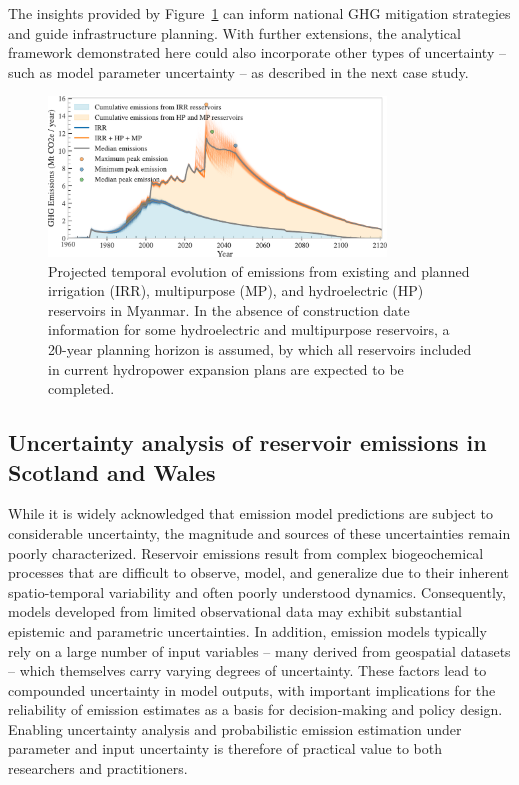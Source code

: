 \documentclass[final,1p,times]{elsarticle}
\begin{document}
The insights provided by Figure~\ref{fig:mya_emission_profile} can inform national \ac{GHG} mitigation strategies and guide infrastructure planning.
With further extensions, the analytical framework demonstrated here could also incorporate other types of uncertainty -- such as model parameter uncertainty -- as described in the next case study.

\begin{figure}[ht]
    \centering
    \includegraphics[width=0.8\textwidth]{figures/emission_profile.pdf}
    \caption{{Projected temporal evolution of emissions from existing and planned irrigation (IRR), multipurpose (MP), and hydroelectric (HP) reservoirs in Myanmar. In the absence of construction date information for some hydroelectric and multipurpose reservoirs, a 20-year planning horizon is assumed, by which all reservoirs included in current hydropower expansion plans are expected to be completed.}}
    \label{fig:mya_emission_profile}
\end{figure}

\subsection{Uncertainty analysis of reservoir emissions in Scotland and Wales}
\label{subsec:scotland_wales}

While it is widely acknowledged that emission model predictions are subject to considerable uncertainty, the magnitude and sources of these uncertainties remain poorly characterized. 
Reservoir emissions result from complex biogeochemical processes that are difficult to observe, model, and generalize due to their inherent spatio-temporal variability and often poorly understood dynamics.
Consequently, models developed from limited observational data may exhibit substantial epistemic and parametric uncertainties.
In addition, emission models typically rely on a large number of input variables -- many derived from geospatial datasets -- which themselves carry varying degrees of uncertainty.
These factors lead to compounded uncertainty in model outputs, with important implications for the reliability of emission estimates as a basis for decision-making and policy design.
Enabling uncertainty analysis and probabilistic emission estimation under parameter and input uncertainty is therefore of practical value to both researchers and practitioners.
\end{document}

